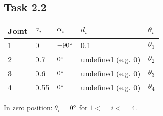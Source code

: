 \subsection*{Task 2.2}
\begin{center}
	\begin{tabular}{ | l | l | l | l | l |}
		\hline
		Joint & $a_{i}$ & $\alpha_{i}$ & $d_i$ & $\theta_i$ \\ \hline
		1 & 0 & $-90\degree$ & 0.1 & $\theta_1$\\ \hline
		2 & 0.7 & $0\degree$ & undefined (e.g. 0) & $\theta_2$\\ \hline
		3 & 0.6 & $0\degree$ & undefined (e.g. 0) & $\theta_3$\\ \hline
		4 & 0.55 & $0\degree$ & undefined (e.g. 0) & $\theta_4$\\ \hline
	\end{tabular}
\end{center}
In zero position: $\theta_i$ = $0\degree$ for $1 <= i <= 4$. 